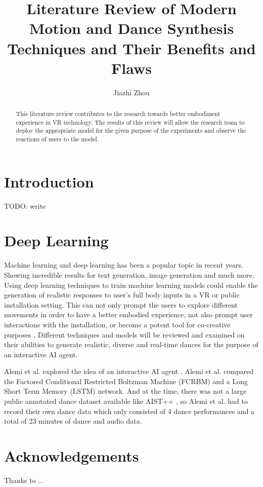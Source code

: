 \documentclass[final,5p,times,twocolumn,authoryear]{article}
\begin{document}
\title{Literature Review of Modern Motion and Dance Synthesis Techniques and Their Benefits and Flaws}
\author{Jiazhi Zhou}
\maketitle

\begin{abstract}

This literature review contributes to the research towards better embodiment experience in VR technology. The results of this review will allow the research team to deploy the appropriate model for the given purpose of the experiments and observe the reactions of users to the model.

\end{abstract}

\section{Introduction}

TODO: write

\section{Deep Learning}

Machine learning and deep learning has been a popular topic in recent years. Showing incredible results for text generation, image generation and much more.
Using deep learning techniques to train machine learning models could enable the generation of realistic responses to user's full body inputs in a VR or public installation setting.
This can not only prompt the users to explore different movements in order to have a better embodied experience, not also prompt user interactions with the installation, or become a potent tool for co-creative purposes \cite{Wallace2023}.
Different techniques and models will be reviewed and examined on their abilities to generate realistic, diverse and real-time dances for the purpose of an interactive AI agent.

Alemi et al. explored the idea of an interactive AI agent \cite{Alemi2017}. Alemi et al. compared the Factored Conditional Restricted Boltzman Machine (FCRBM) and a Long Short Term Memory (LSTM) network. And at the time, there was not a large public annotated dance dataset available like AIST++ \cite{Li2021}, so Alemi et al. had to record their own dance data which only consisted of 4 dance performances and a total of 23 minutes of dance and audio data.


\section*{Acknowledgements}
Thanks to ...

 

\end{document}
